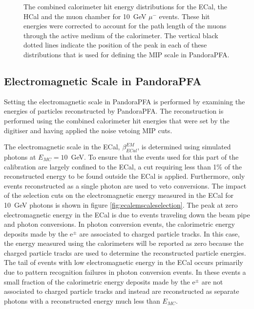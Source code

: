 \begin{figure}[h!]
\caption[The combined calorimeter hit energy distributions for \protect{} the ECal, \protect{} the HCal and \protect{} the muon chamber for 10~GeV $\mu^{-}$ events.  These hit energies were corrected to account for the path length of the muons through the active medium of the calorimeter.  The vertical black dotted lines indicate the position of the peak in each of these distributions that is used for defining the MIP scale in PandoraPFA.]{The combined calorimeter hit energy distributions for \protect{} the ECal, \protect{} the HCal and \protect{} the muon chamber for 10~GeV $\mu^{-}$ events.  These hit energies were corrected to account for the path length of the muons through the active medium of the calorimeter.  The vertical black dotted lines indicate the position of the peak in each of these distributions that is used for defining the MIP scale in PandoraPFA.}
\label{fig:pandoramip}
\end{figure}


\subsection{Electromagnetic Scale in PandoraPFA}
\label{sec:emscalesetting}
Setting the electromagnetic scale in PandoraPFA is performed by examining the energies of particles reconstructed by PandoraPFA.  The reconstruction is performed using the combined calorimeter hit energies that were set by the digitiser and having applied the noise vetoing MIP cuts.  

The electromagnetic scale in the ECal, $\beta^{EM}_{ECal}$, is determined using simulated photons at $E_{MC} = 10$~GeV.  To ensure that the events used for this part of the calibration are largely confined to the ECal, a cut requiring less than 1\% of the reconstructed energy to be found outside the ECal is applied.  Furthermore, only events reconstructed as a single photon are used to veto conversions.  The impact of the selection cuts on the electromagnetic energy measured in the ECal for 10~GeV photons is shown in figure \ref{fig:ecalemscaleselection}.  The peak at zero electromagnetic energy in the ECal is due to events traveling down the beam pipe and photon conversions.  In photon conversion events, the calorimetric energy deposits made by the $\text{e}^{\pm}$ are associated to charged particle tracks.  In this case, the energy measured using the calorimeters will be reported as zero because the charged particle tracks are used to determine the reconstructed particle energies.  The tail of events with low electromagnetic energy in the ECal occurs primarily due to pattern recognition failures in photon conversion events.  In these events a small fraction of the calorimetric energy deposits made by the $\text{e}^{\pm}$ are not associated to charged particle tracks and instead are reconstructed as separate photons with a reconstructed energy much less than $E_{MC}$.

